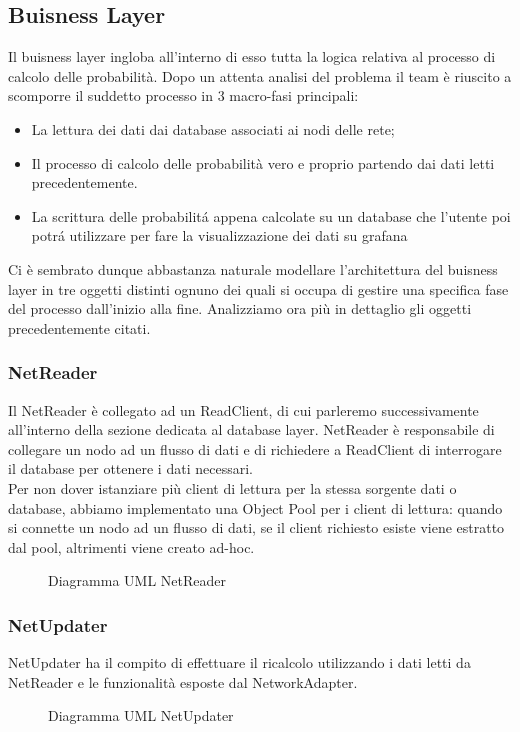 \subsection{Buisness Layer}
Il buisness layer ingloba all'interno di esso tutta la logica relativa al processo di calcolo delle probabilità.
Dopo un attenta analisi del problema il team è riuscito a scomporre il suddetto processo in 3 macro-fasi principali:
\begin{itemize}
	\item La lettura dei dati dai database associati ai nodi delle rete;
	\item Il processo di calcolo delle probabilità vero e proprio partendo dai dati letti precedentemente.
	\item La scrittura delle probabilitá appena calcolate su un database che l'utente poi potrá utilizzare per fare la visualizzazione dei dati su grafana
\end{itemize}
Ci è sembrato dunque abbastanza naturale modellare l'architettura del buisness layer in tre oggetti distinti ognuno dei quali si occupa di gestire una specifica fase del processo dall'inizio alla fine.
Analizziamo ora più in dettaglio gli oggetti precedentemente citati.
\subsubsection{NetReader}
Il NetReader è collegato ad un ReadClient, di cui parleremo successivamente all'interno della sezione dedicata al database layer. NetReader è responsabile di collegare un nodo ad un flusso di dati e di richiedere a ReadClient di interrogare il database per ottenere i dati necessari.\\
Per non dover istanziare più client di lettura per la stessa sorgente dati o database, abbiamo implementato una Object Pool per i client di lettura: quando si connette un nodo ad un flusso di dati, se il client richiesto esiste viene estratto dal pool, altrimenti viene creato ad-hoc.
\begin{figure} [H]
	\centering
	
	\caption{Diagramma UML NetReader}\label{}
\end{figure}
\subsubsection{NetUpdater}
NetUpdater ha il compito di effettuare il ricalcolo utilizzando i dati letti da NetReader e le funzionalità esposte dal NetworkAdapter.
\begin{figure} [H]
	\centering
	
	\caption{Diagramma UML NetUpdater}\label{}
\end{figure}
